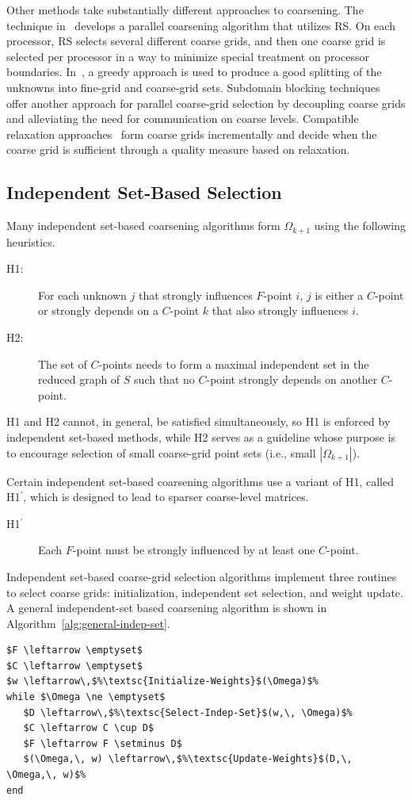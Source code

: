 \documentclass{elsart}
\newcommand{\hp}{H1$^\prime$}
\begin{document}
Other methods take substantially different approaches to
coarsening. The technique in~\cite{Griebel2006} develops a parallel
coarsening algorithm that utilizes RS. On each processor, RS selects
several different coarse grids, and then one coarse grid is selected
per processor in a way to minimize special treatment on processor
boundaries. In~\cite{MacLachlan2006}, a greedy approach is used to
produce a good splitting of the unknowns into fine-grid and
coarse-grid sets. Subdomain blocking techniques~\cite{Krechel2001}
offer another approach for parallel coarse-grid selection by
decoupling coarse grids and alleviating the need for communication on
coarse levels. Compatible relaxation
approaches~\cite{Brandt2000,Livne2004,Brannick2005} form coarse grids
incrementally and decide when the coarse grid is sufficient through a
quality measure based on relaxation.

\subsection{Independent Set-Based Selection}
\label{sec:indep-set-based}
Many independent set-based coarsening algorithms form $\Omega_{k+1}$
using the following heuristics.
\begin{description}
\item[H1:] For each unknown $j$ that strongly influences $F$-point
  $i$, $j$ is either a $C$-point or strongly depends on a $C$-point
  $k$ that also strongly influences $i$.
\item[H2:] The set of $C$-points needs to form a maximal independent
  set in the reduced graph of $S$ such that no $C$-point strongly
  depends on another $C$-point.
\end{description}
H1 and H2 cannot, in general, be satisfied simultaneously, so H1 is
enforced by independent set-based methods, while H2 serves as a
guideline whose purpose is to encourage selection of small
coarse-grid point sets (i.e., small $|\Omega_{k+1}|$).

Certain independent set-based coarsening algorithms use a variant of
H1, called \hp, which is designed to lead to sparser coarse-level
matrices.
\begin{description}
\item[\hp] Each $F$-point must be strongly influenced by at least one
  $C$-point.
\end{description}

Independent set-based coarse-grid selection algorithms implement three
routines to select coarse grids: initialization, independent set
selection, and weight update. A general independent-set based
coarsening algorithm is shown in
Algorithm~\ref{alg:general-indep-set}.
\begin{lstlisting}[caption={Independent Set-Based Coarse Grid
Selection},label=alg:general-indep-set]
%\textsc{Indep-Set-Coarse-Grid-Selection}$(\Omega)$:%
$F \leftarrow \emptyset$
$C \leftarrow \emptyset$
$w \leftarrow\,$%\textsc{Initialize-Weights}$(\Omega)$%
while $\Omega \ne \emptyset$
   $D \leftarrow\,$%\textsc{Select-Indep-Set}$(w,\, \Omega)$%
   $C \leftarrow C \cup D$
   $F \leftarrow F \setminus D$
   $(\Omega,\, w) \leftarrow\,$%\textsc{Update-Weights}$(D,\, \Omega,\, w)$%
end
\end{lstlisting}
\end{document}
